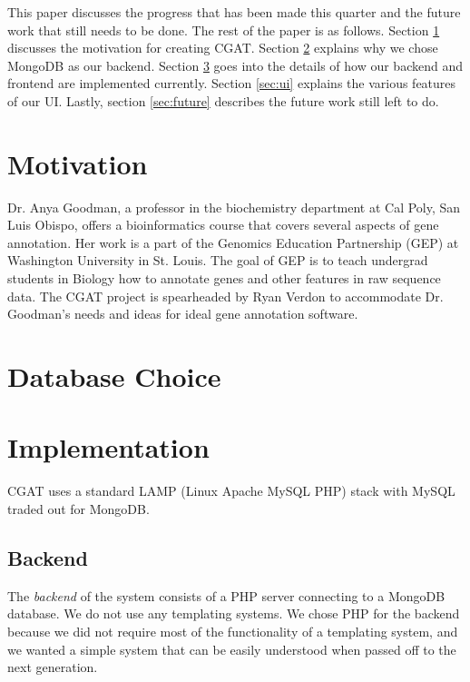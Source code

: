 \documentclass[10pt, conference, compsocconf]{IEEEtran}
\begin{document}
This paper discusses the progress that has been made this quarter and the future work that 
still needs to be done. The rest of the paper is as follows. Section \ref{sec:motive} discusses the
motivation for creating CGAT. Section \ref{sec:choice} explains why we chose MongoDB
as our backend. Section \ref{sec:implementation} goes into the details of how
our backend and frontend are implemented currently. Section \ref{sec:ui} explains the
various features of our UI. Lastly, section \ref{sec:future} describes the future work still left to
do.

\section{Motivation}\label{sec:motive}
Dr. Anya Goodman, a professor in the biochemistry department at Cal Poly, San Luis
Obispo, offers a bioinformatics course that covers several aspects of gene
annotation. Her work is a part of the Genomics Education Partnership (GEP) at 
Washington University in St. Louis.\cite{gep} The goal of GEP is to teach undergrad students
in Biology how to annotate genes and other features in raw sequence data.
The CGAT project is spearheaded by Ryan Verdon to accommodate Dr.
Goodman's needs and ideas for ideal gene annotation software.

\section{Database Choice}\label{sec:choice}

\section{Implementation}\label{sec:implementation}
CGAT uses a standard LAMP (Linux Apache MySQL PHP) stack with MySQL traded out for MongoDB.

\subsection{Backend}
The \textit{backend} of the system consists of a PHP server connecting to a MongoDB database.
We do not use any templating systems.
We chose PHP for the backend because we did not require most of the functionality of a templating system, and we wanted a simple
system that can be easily understood when passed off to the next generation.
\end{document}
